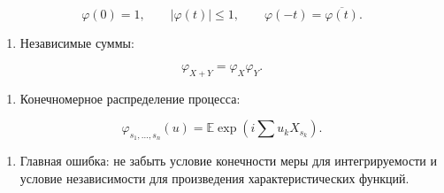 \documentclass[
  11pt,
  a4paper,
]{article}
\providecommand{\tightlist}{%
  \setlength{\itemsep}{0pt}\setlength{\parskip}{0pt}}
\begin{document}
\[
\varphi(0)=1,\qquad |\varphi(t)|\le1,\qquad
\varphi(-t)=\overline{\varphi(t)}.
\]

\begin{enumerate}
\def\labelenumi{\arabic{enumi}.}
\setcounter{enumi}{4}
\tightlist
\item
  Независимые суммы:
\end{enumerate}

\[
\varphi_{X+Y}=\varphi_X\varphi_Y.
\]

\begin{enumerate}
\def\labelenumi{\arabic{enumi}.}
\setcounter{enumi}{5}
\tightlist
\item
  Конечномерное распределение процесса:
\end{enumerate}

\[
\varphi_{s_1,\ldots,s_n}(u)
=
\mathbb E\exp\left(i\sum u_kX_{s_k}\right).
\]

\begin{enumerate}
\def\labelenumi{\arabic{enumi}.}
\setcounter{enumi}{6}
\tightlist
\item
  Главная ошибка: не забыть условие конечности меры для интегрируемости
  и условие независимости для произведения характеристических функций.
\end{enumerate}

\newpage
\end{document}
